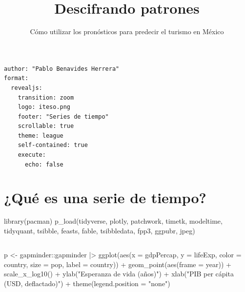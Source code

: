 \documentclass[
  letterpaper,
  DIV=11,
  numbers=noendperiod]{scrartcl}
\title{Descifrando patrones}
\subtitle{Cómo utilizar los pronósticos para predecir el turismo en
México}
\author{}
\date{}
\newenvironment{Shaded}{}{}
\newcommand{\AttributeTok}[1]{\textcolor[rgb]{0.65,0.15,0.64}{#1}}
\newcommand{\FunctionTok}[1]{\textcolor[rgb]{0.25,0.47,0.95}{#1}}
\newcommand{\NormalTok}[1]{\textcolor[rgb]{0.22,0.23,0.26}{#1}}
\newcommand{\OtherTok}[1]{\textcolor[rgb]{0.15,0.68,0.38}{#1}}
\newcommand{\SpecialCharTok}[1]{\textcolor[rgb]{0.00,0.52,0.74}{#1}}
\newcommand{\StringTok}[1]{\textcolor[rgb]{0.31,0.63,0.31}{#1}}
\renewcommand*\contentsname{Table of contents}
\newcommand\contentsname{Table of contents}
\begin{document}
\maketitle

\renewcommand*\contentsname{Table of contents}
{
\hypersetup{linkcolor=}
\setcounter{tocdepth}{3}
\tableofcontents
}
\begin{verbatim}
author: "Pablo Benavides Herrera"
format: 
  revealjs:
    transition: zoom
    logo: iteso.png
    footer: "Series de tiempo"
    scrollable: true
    theme: league
    self-contained: true
    execute:
      echo: false
\end{verbatim}

\section{¿Qué es una serie de
tiempo?}\label{quuxe9-es-una-serie-de-tiempo}

\begin{Shaded}
\begin{Highlighting}[]
\FunctionTok{library}\NormalTok{(pacman)}
\FunctionTok{p\_load}\NormalTok{(tidyverse, plotly, patchwork, timetk, modeltime, tidyquant, tsibble, feasts, fable, tsibbledata, fpp3, ggpubr, jpeg)}
\end{Highlighting}
\end{Shaded}

\subsection{}\label{section}

\begin{Shaded}
\begin{Highlighting}[]
\NormalTok{p }\OtherTok{\textless{}{-}}\NormalTok{ gapminder}\SpecialCharTok{::}\NormalTok{gapminder }\SpecialCharTok{|\textgreater{}} 
  \FunctionTok{ggplot}\NormalTok{(}\FunctionTok{aes}\NormalTok{(}\AttributeTok{x =}\NormalTok{ gdpPercap, }\AttributeTok{y =}\NormalTok{ lifeExp, }\AttributeTok{color =}\NormalTok{ country,}
                       \AttributeTok{size =}\NormalTok{ pop, }\AttributeTok{label =}\NormalTok{ country)) }\SpecialCharTok{+}
  \FunctionTok{geom\_point}\NormalTok{(}\FunctionTok{aes}\NormalTok{(}\AttributeTok{frame =}\NormalTok{ year)) }\SpecialCharTok{+} 
  \FunctionTok{scale\_x\_log10}\NormalTok{() }\SpecialCharTok{+} 
  \FunctionTok{ylab}\NormalTok{(}\StringTok{"Esperanza de vida (años)"}\NormalTok{) }\SpecialCharTok{+}
  \FunctionTok{xlab}\NormalTok{(}\StringTok{"PIB per cápita (USD, deflactado)"}\NormalTok{) }\SpecialCharTok{+}
  \FunctionTok{theme}\NormalTok{(}\AttributeTok{legend.position =} \StringTok{"none"}\NormalTok{)}
\end{Highlighting}
\end{Shaded}
\end{document}
